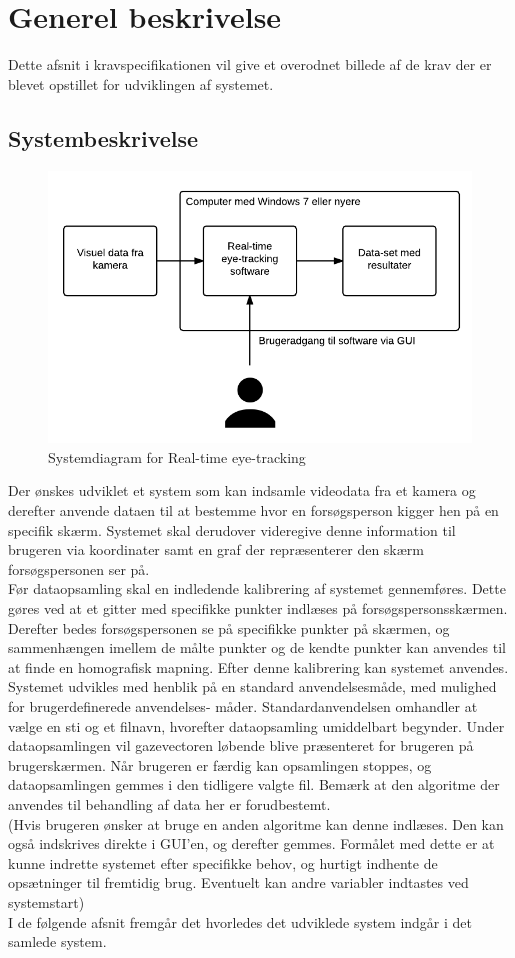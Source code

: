 \documentclass[kravspec.tex]{subfiles}
\begin{document}
\section{Generel beskrivelse}
Dette afsnit i kravspecifikationen vil give et overodnet billede af de krav der er blevet opstillet for udviklingen af systemet.
	
\subsection{Systembeskrivelse}
\begin{figure}[h]
\centering
\includegraphics[width=0.7\linewidth]{../Systemdiagram.png}
\caption[Systemdiagram]{Systemdiagram for Real-time eye-tracking}
\label{fig:Systemdiagram}
\end{figure}
Der ønskes udviklet et system som kan indsamle videodata fra et kamera og derefter anvende dataen til
at bestemme hvor en forsøgsperson kigger hen på en specifik skærm. Systemet skal derudover videregive
denne information til brugeren via koordinater samt en graf der repræsenterer den skærm forsøgspersonen
ser på.
\\
\indent
Før dataopsamling skal en indledende kalibrering af systemet gennemføres. Dette gøres ved at et gitter med
specifikke punkter indlæses på forsøgspersonsskærmen. Derefter bedes forsøgspersonen se på specifikke punkter
på skærmen, og sammenhængen imellem de målte punkter og de kendte punkter kan anvendes til at finde en
homografisk mapning. Efter denne kalibrering kan systemet anvendes.
\\
\indent
Systemet udvikles med henblik på en standard anvendelsesmåde, med mulighed for brugerdefinerede anvendelses-
måder. Standardanvendelsen omhandler at vælge en sti og et filnavn, hvorefter dataopsamling umiddelbart begynder.
Under dataopsamlingen vil gazevectoren løbende blive præsenteret for brugeren på brugerskærmen. Når brugeren er 
færdig kan opsamlingen stoppes, og dataopsamlingen gemmes i den tidligere valgte fil. Bemærk at den algoritme
der anvendes til behandling af data her er forudbestemt.
\\
(Hvis brugeren ønsker at bruge en anden algoritme kan denne indlæses. Den kan også indskrives direkte i
GUI'en, og derefter gemmes. Formålet med dette er at kunne indrette systemet efter specifikke behov, og
hurtigt indhente de opsætninger til fremtidig brug. Eventuelt kan andre variabler indtastes ved systemstart) 
\\
\indent
I de følgende afsnit fremgår det hvorledes det udviklede system indgår i det samlede system.
\end{document}
